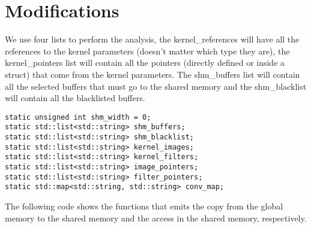 \documentclass{article}
\begin{document}
\section{Modifications}

We use four lists to perform the analysis, the kernel\_references will have all the references to the kernel parameters (doesn't matter which type they are), the kernel\_pointers list will contain all the pointers (directly defined or inside a struct) that come from the kernel parameters. The shm\_buffers list will contain all the selected buffers that must go to the shared memory and the shm\_blacklist will contain all the blacklisted buffers.

\begin{verbatim}
static unsigned int shm_width = 0;
static std::list<std::string> shm_buffers;
static std::list<std::string> shm_blacklist;
static std::list<std::string> kernel_images;
static std::list<std::string> kernel_filters;
static std::list<std::string> image_pointers;
static std::list<std::string> filter_pointers;
static std::map<std::string, std::string> conv_map;
\end{verbatim}

The following code shows the functions that emits the copy from the global memory to the shared memory and the access in the shared memory, respectively.
\end{document}
